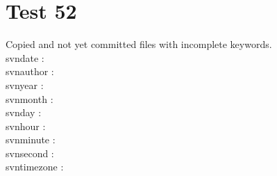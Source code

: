 \documentclass[12pt]{report}
\begin{document}
\chapter{Test 52}
Copied and not yet committed files with incomplete keywords.\\

\noindent
 svndate : \svndate  \\
 svnauthor : \svnauthor  \\
 svnyear : \svnyear  \\
 svnmonth : \svnmonth  \\
 svnday : \svnday  \\
 svnhour : \svnhour  \\
 svnminute : \svnminute  \\
 svnsecond : \svnsecond  \\
 svntimezone : \svntimezone  \\
\end{document}
